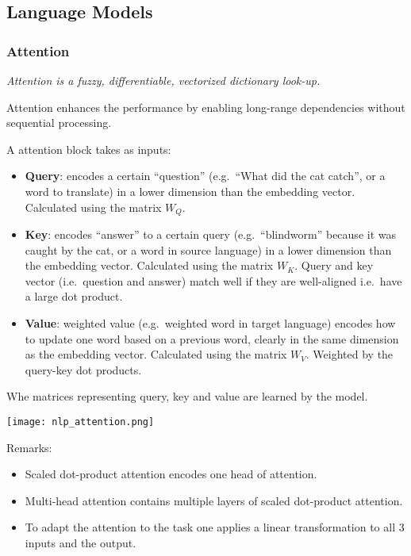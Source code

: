 \subsection{Language Models}
\subsubsection{Attention}
\textit{Attention is a fuzzy, differentiable, vectorized dictionary look-up.}

\newpar{}
Attention enhances the performance by enabling long-range dependencies without sequential processing.

\newpar{}
A attention block takes as inputs:
\begin{itemize}
    \item \textbf{Query}: encodes a certain ``question'' (e.g.\ ``What did the cat catch'', or a word to translate) in a lower dimension than the embedding vector. Calculated using the matrix $W_Q$.
    \item \textbf{Key}: encodes ``answer'' to a certain query (e.g.\ ``blindworm'' because it was caught by the cat, or a word in source language) in a lower dimension than the embedding vector. Calculated using the matrix $W_K$. Query and key vector (i.e.\ question and answer) match well if they are well-aligned i.e.\ have a large dot product.
    \item \textbf{Value}: weighted value (e.g.\ weighted word in target language) encodes how to update one word based on a previous word, clearly in the same dimension as the embedding vector. Calculated using the matrix $W_V$. Weighted by the query-key dot products.
\end{itemize}
Whe matrices representing query, key and value are learned by the model.

\newpar{}
\begin{center}
    \texttt{[image: nlp\_attention.png]}
\end{center}
Remarks:
\begin{itemize}
    \item Scaled dot-product attention encodes one head of attention.
    \item Multi-head attention contains multiple layers of scaled dot-product attention.
    \item To adapt the attention to the task one applies a linear transformation to all 3 inputs and the output. 
\end{itemize}


